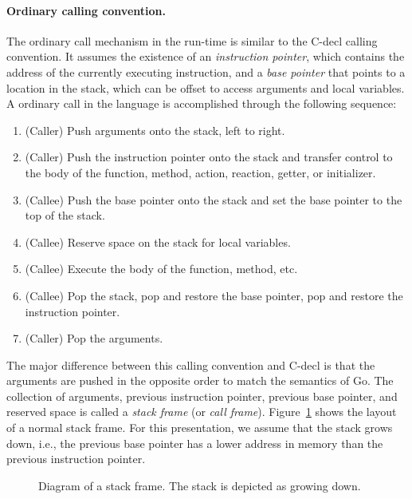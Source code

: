 \paragraph{Ordinary calling convention.}
The ordinary call mechanism in the run-time is similar to the C-decl calling convention.
It assumes the existence of an \emph{instruction pointer}, which contains the address of the currently executing instruction, and a \emph{base pointer} that points to a location in the stack, which can be offset to access arguments and local variables.
A ordinary call in the language is accomplished through the following sequence:
\begin{enumerate}
\item (Caller) Push arguments onto the stack, left to right.
\item (Caller) Push the instruction pointer onto the stack and transfer control to the body of the function, method, action, reaction, getter, or initializer.
\item (Callee) Push the base pointer onto the stack and set the base pointer to the top of the stack.
\item (Callee) Reserve space on the stack for local variables.
\item (Callee) Execute the body of the function, method, etc.
\item (Callee) Pop the stack, pop and restore the base pointer, pop and restore the instruction pointer.
\item (Caller) Pop the arguments.
\end{enumerate}
The major difference between this calling convention and C-decl is that the arguments are pushed in the opposite order to match the semantics of Go.
The collection of arguments, previous instruction pointer, previous base pointer, and reserved space is called a \emph{stack frame} (or \emph{call frame}).
Figure~\ref{frame} shows the layout of a normal stack frame.
For this presentation, we assume that the stack grows down, i.e., the previous base pointer has a lower address in memory than the previous instruction pointer.

\begin{figure}
\centering
{}%
\caption{Diagram of a stack frame\label{frame}.  The stack is depicted as growing down.}
\end{figure}

